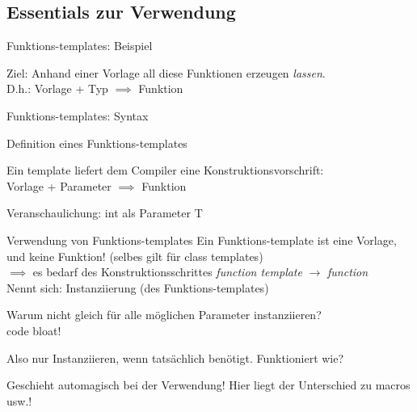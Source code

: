\subsection{Essentials zur Verwendung}

\begin{frame}[t]{Funktions-templates: Beispiel}


	Ziel: Anhand einer Vorlage all diese Funktionen erzeugen \emph{lassen}.\\
	D.h.: Vorlage + Typ $\implies$ Funktion
	
	\vspace{2em}
	
	\onslide*<+> {  }
	\lstset{morecomment=[l][\invisible]template}
	\onslide*<+> {  }
	\lstset{deletecomment=[l]template}
	\onslide*<+-> {  }
\end{frame}

\begin{frame}[fragile]{Funktions-templates: Syntax}
	\begin{block}{Definition eines Funktions-templates}
		
	\end{block}
	
	Ein template liefert dem Compiler eine Konstruktionsvorschrift:\\
	Vorlage + Parameter $\implies$ Funktion
	
	\pause
	\vspace{1em}
	
	\begin{block}{Veranschaulichung: int als Parameter T}
		
	\end{block}
\end{frame}

\begin{frame}{Verwendung von Funktions-templates}
	Ein Funktions-template ist eine Vorlage, und keine Funktion! (selbes gilt für class templates)\\
	$\implies$ es bedarf des Konstruktionsschrittes \emph{function template} $\rightarrow$ \emph{function}\\
	Nennt sich: Instanziierung (des Funktions-templates)
	
	\vspace{1em}
	
	Warum nicht gleich für alle möglichen Parameter instanziieren?\\
	\pause
	\alert<+>{code bloat!}
	
	\uncover<+->
	{
		\vspace{1em}
		Also nur Instanziieren, wenn tatsächlich benötigt. Funktioniert wie?
	}
	
	\uncover<+->
	{
		\vspace{1em}
		Geschieht \alert{automagisch bei der Verwendung}! Hier liegt der Unterschied zu macros usw.!
	}
\end{frame}

